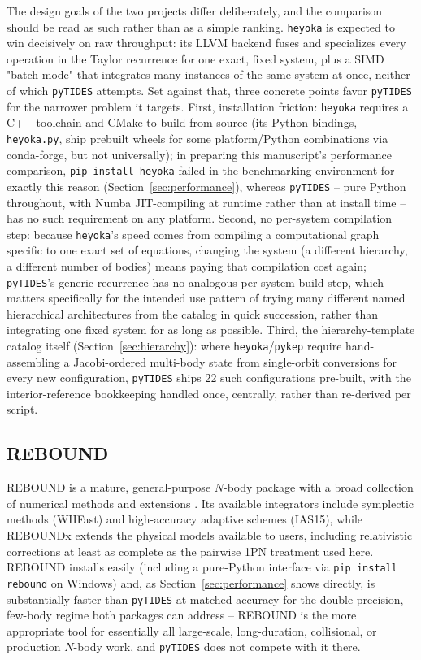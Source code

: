 \documentclass[11pt]{article}
\begin{document}
The design goals of the two projects differ deliberately, and the
comparison should be read as such rather than as a simple ranking.
\texttt{heyoka} is expected to win decisively on raw throughput: its LLVM
backend fuses and specializes every operation in the Taylor recurrence for
one exact, fixed system, plus a SIMD "batch mode" that integrates many
instances of the same system at once, neither of which \texttt{pyTIDES}
attempts. Set against that, three concrete points favor \texttt{pyTIDES}
for the narrower problem it targets. First, installation friction:
\texttt{heyoka} requires a C++ toolchain and CMake to build from source (its
Python bindings, \texttt{heyoka.py}, ship prebuilt wheels for some
platform/Python combinations via conda-forge, but not universally); in
preparing this manuscript's performance comparison,
\texttt{pip install heyoka} failed in the benchmarking environment for
exactly this reason (Section~\ref{sec:performance}), whereas
\texttt{pyTIDES} -- pure Python throughout, with Numba JIT-compiling at
runtime rather than at install time -- has no such requirement on any
platform. Second, no per-system compilation step: because \texttt{heyoka}'s
speed comes from compiling a computational graph specific to one exact set
of equations, changing the system (a different hierarchy, a different
number of bodies) means paying that compilation cost again; \texttt{pyTIDES}'s
generic recurrence has no analogous per-system build step, which matters
specifically for the intended use pattern of trying many different named
hierarchical architectures from the catalog in quick succession, rather
than integrating one fixed system for as long as possible. Third, the
hierarchy-template catalog itself (Section~\ref{sec:hierarchy}): where
\texttt{heyoka}/\texttt{pykep} require hand-assembling a Jacobi-ordered
multi-body state from single-orbit conversions for every new configuration,
\texttt{pyTIDES} ships 22 such configurations pre-built, with the
interior-reference bookkeeping handled once, centrally, rather than
re-derived per script.


\subsection{REBOUND}

REBOUND is a mature, general-purpose $N$-body package with a broad
collection of numerical methods and extensions \citep{Rein2012}. Its
available integrators include symplectic methods (WHFast) and
high-accuracy adaptive schemes (IAS15), while REBOUNDx extends the physical
models available to users, including relativistic corrections at least as
complete as the pairwise 1PN treatment used here. REBOUND installs easily
(including a pure-Python interface via \texttt{pip install rebound} on
Windows) and, as Section~\ref{sec:performance} shows directly, is
substantially faster than \texttt{pyTIDES} at matched accuracy for the
double-precision, few-body regime both packages can address -- REBOUND is
the more appropriate tool for essentially all large-scale, long-duration,
collisional, or production $N$-body work, and \texttt{pyTIDES} does not
compete with it there.
\end{document}
